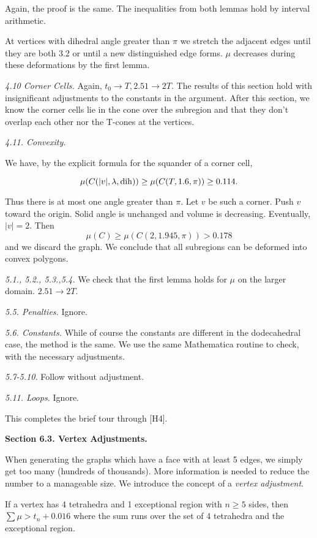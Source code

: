 Again, the proof is the same.  The inequalities from both lemmas hold by interval arithmetic.

At vertices with dihedral angle greater than $\pi$ we stretch the adjacent
edges until they are both 3.2 or until a new distinguished edge forms.  $\mu $
decreases during these deformations by the first lemma.

{\it 4.10 Corner Cells.} Again, $t_0\to T, 2.51\to 2T$.  The results of
this section hold with insignificant
   adjustments to the constants in the argument.  After this section, we know
   the corner cells lie in the cone over the subregion and that they don't
   overlap each other nor the T-cones at the vertices.

{\it 4.11. Convexity.}  

We have, by the explicit formula for the squander of a corner cell,

$$\mu(C(|v|,\lambda,\operatorname{dih}))\ge \mu(C(T,1.6,\pi))\ge 0.114.$$

Thus there is at most one angle greater than $\pi$.  Let $v$ be such a
corner.  Push $v$ toward the origin.  Solid angle is unchanged and volume is
decreasing. Eventually, $|v|=2$.  Then 
$$\mu(C)\ge\mu(C(2,1.945,\pi))>0.178$$ and we discard the graph.  We conclude
that all subregions can be deformed into convex polygons.

{\it 5.1., 5.2., 5.3.,5.4.} We check that the first lemma holds for $\mu$ on the
      larger domain.  $2.51\to 2T$.  

{\it 5.5. Penalties.} Ignore.

{\it 5.6. Constants.} While of course the constants are different in the
      dodecahedral case, the method is the same.  We use the same Mathematica
      routine to check, with the necessary adjustments.  

{\it 5.7-5.10.} Follow without adjustment. 

{\it 5.11. Loops.} Ignore.

This completes the brief tour through [H4].


\bigskip

{\bf Section 6.3. Vertex Adjustments.}

\bigskip


When generating the graphs which have a face with at least 5 edges, we simply get too many (hundreds of thousands).  More information is needed to reduce the number to a manageable size.  We introduce the concept of a {\it vertex adjustment}.  

 If a vertex has 4 tetrahedra and 1 exceptional region with $n\ge5$ sides, then $\sum\mu > t_n+0.016$ where the sum runs over the set of 4 tetrahedra and the exceptional region.
\endproclaim

